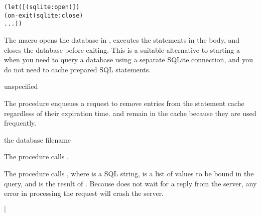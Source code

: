 \begin{syntax}
\end{syntax}
\expandsto{} \antipar\begin{alltt}
(let ([ (sqlite:open  )])
  (on-exit (sqlite:close )
      ...))
\end{alltt}

The  macro opens the database in ,
executes the statements in the body, and closes the database before
exiting.  This is a suitable alternative to starting a
 when you need to query a database using a separate
SQLite connection, and you do not need to cache prepared SQL
statements.

\begin{procedure}
\end{procedure}
\returns{} unspecified

The  procedure enqueues a request to remove
entries from the statement cache regardless of their expiration
time.  and  remain in the cache
because they are used frequently.

\begin{procedure}
\end{procedure}
\returns{} the database filename

The  procedure calls .

\begin{procedure}
\end{procedure}
\returns{}

The  procedure calls , where  is a SQL string,
 is a list of values to be bound in the query, and
 is the result of .
Because  does not wait for a reply from the server, any
error in processing the request will crash the server.

\begin{procedure}
\end{procedure}
\returns{}
 $|$

